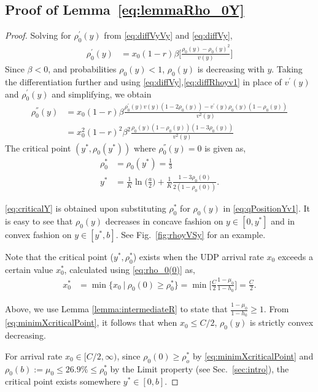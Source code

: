 \documentclass{IEEEtran}
\begin{document}
    \subsection*{Proof of Lemma~\ref{eq:lemmaRho_0Y}}
    \vspace{3mm}
\begin{proof}
     Solving for $\rho_0^{'}(y)$ from \eqref{eq:diffVyVy}  and \eqref{eq:diffVy},
        \begin{align}
            \rho_0^{'}(y)   &= x_0(1-r)\beta \bigg[\frac{\rho_0(y)-\rho_0(y)^2}{v(y)} \bigg]            \label{eq:diffRhoyv1}
\end{align}
        Since $\beta < 0$, and probabilities $\rho_0(y)< 1$, $\rho_0(y)$ is decreasing with $y$. Taking the differentiation further and using \eqref{eq:diffVy},\eqref{eq:diffRhoyv1} in place of $v^{'}(y)$ and $\rho_0^{'}(y)$ and simplifying, we obtain
        \begin{align}
            \rho_0^{''}(y)  &= x_0(1-r)\beta \frac{\rho_0^{'}(y)v(y)(1-2\rho_0(y))-v^{'}(y)\rho_0(y)(1-\rho_0(y)) }{v^2(y)} \nonumber \\
                            &= x_0^2(1-r)^2\beta^2 \frac{\rho_0(y)(1-\rho_0(y))(1-3\rho_0(y))}{v^2(y)} \label{eq:diffdiffRhoy}
        \end{align}
    The critical point $(y^*,\rho_0(y^*))$ where $\rho_0^{''}(y)=0$ is given as,
    \begin{align}
        \rho_0^*    &=\rho_0(y^*)= \frac{1}{3} \label{eq:criticalRho_0Y} \\
        y^*         &= \frac{1}{K} \ln\bigg(\frac{a}{2}\bigg)+\frac{1}{K} \frac{1-3\rho_0(0)}{2(1-\rho_0(0))}. \label{eq:criticalY}
    \end{align}

    \eqref{eq:criticalY} is obtained upon substituting $\rho_0^*$ for $\rho_0(y)$ in \eqref{eq:qPositionYv1}.
    It is easy to see that $\rho_0(y)$ decreases in concave fashion on $y\in [0,y^*]$ and in convex fashion on $y\in[y^*,b]$. See Fig.~\ref{fig:rhoyVSy} for an example.

    Note that the critical point ($y^*, \rho_0^*$) exists when the UDP arrival rate $x_0$ exceeds a certain value $x_0^*$, calculated using \eqref{eq:rho_0(0)} as,
    \begin{align}\label{eq:minimXcriticalPoint}
        x_0^*&= \min\{x_0~ |~ \rho_0(0) \geqslant \rho_0^*\}= \min\bigg[ \frac{C}{2}\frac{1-\mu_0}{1-h_0}\bigg]= \frac{C}{2}.
    \end{align}

    Above, we use Lemma \ref{lemma:intermediateR} to state that $\frac{1-\mu_0}{1-h_0} \geqslant 1$. From \eqref{eq:minimXcriticalPoint}, it follows that when $x_0 \leqslant C/2$, $\rho_0(y)$ is strictly convex decreasing.

     For arrival rate $x_0\in[C/2,\infty)$, since $\rho_0(0)\geqslant \rho_o^*$ by \eqref{eq:minimXcriticalPoint} and $\rho_0(b):=\mu_0 \leqslant 26.9\% \leqslant \rho_0^*$ by the Limit property (see Sec.~\ref{sec:intro}), the critical point exists somewhere $y^*\in[0,b]$.

     \end{proof}
\end{document}
